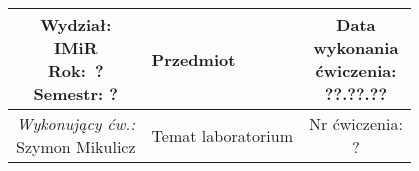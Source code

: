 \documentclass[polish,a4paper,11pt]{mwart}
\begin{document}
\begin{table}[h] %
  \centering
  \begin{tabular}{ | c |  >{\centering\arraybackslash}m{5.5cm} | c | }
    \hline
    \makecell{ \textbf{Wydział:} \\ IMiR \\ \textbf{Rok:}~? \\ Semestr: ? } &
    \textbf{\large{Przedmiot}} &
    \makecell{Data \\ wykonania \\ ćwiczenia: \\ ??.??.??} \\ \hline
    \makecell{\emph{Wykonujący ćw.:}\\Szymon Mikulicz} &
    \large{Temat laboratorium} &
    \makecell{Nr ćwiczenia: \\ ?} \\ \hline
  \end{tabular}
\end{table}
\end{document}

